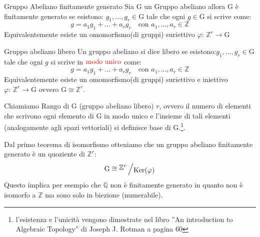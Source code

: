 \documentclass[11pt, a4paper, twoside]{article}
\newcommand{\bigslant}[2]{{\raisebox{.2em}{$#1$}\left/\raisebox{-.2em}{$#2$}\right.}}
\begin{document}
\begin{defn}{Gruppo Abeliano finitamente generato}{}
	Sia G un Gruppo abeliano allora G è finitamente generato se esistono: $g_1,\dots,g_r\in \text{G}$ tale che ogni $g\in\text{G}$ si scrive come:
	\[
		g=a_1g_1+\dots+a_rg_r\quad\text{con }a_1,\dots,a_r\in\mathbb{Z}
	\]
	Equivalentemente esiste un omomorfismo(di gruppi) suriettivo $\varphi:\,\mathbb{Z}^r\rightarrow \text{G}$ 
\end{defn}

\begin{defn}{Gruppo abeliano libero}{}
	Un gruppo abeliano si dice libero se esistono:$g_1,\dots,g_r\in \text{G}$ tale che ogni $g$ si scrive in $\color{red}{\text{modo unico}}$ come:  
	\[
		g=a_1g_1+\dots+a_rg_r\quad\text{con }a_1,\dots,a_r\in\mathbb{Z}
	\]
	Equivalentemente esiste un omomorfismo(di gruppi) suriettivo e iniettivo $\varphi:\,\mathbb{Z}^r\rightarrow \text{G}$ ovvero $\text{G}\cong\mathbb{Z}^r$.
\end{defn}
	Chiamiamo Rango di G (gruppo abeliano libero) $r$, ovvero il numero di elementi che scrivono ogni elemento di G in modo unico e l'insieme di tali elementi (analogamente agli spazi vettoriali) si definisce base di G.\footnote{l'esistenza e l'unicità vengono dimostrate nel libro ''An introduction to Algebraic Topology'' di Joseph J. Rotman a pagina 60}. 

\begin{oss}
	Dal primo teorema di isomorfismo otteniamo che un gruppo abeliano finitamente generato è un quoziente di $\mathbb{Z}^r$:
	\[
		\text{G}\cong\bigslant{\mathbb{Z}^r}{\text{Ker}(\varphi)}
	\]
	Questo implica per esempio che $\mathbb{Q}$ non è finitamente generato in quanto non è isomorfo a $\mathbb{Z}$ ma sono solo in biezione (numerabile).
\end{oss}
\end{document}
